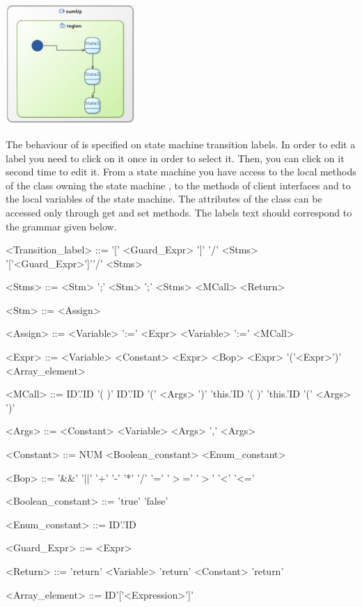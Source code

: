 \documentclass[12pt]{article}
\begin{document}
     \centerline{
     \includegraphics[width=5cm]{draws/sm-no-lbl.png}
     \label{fig:vce-proj}
     }
     
The behaviour of is specified on state machine transition labels. In order to edit a label you need to click on it once in order to select it. Then, you can click on it second time to edit it. From a state machine you have access to the local methods of the class owning the state machine , to the methods of client interfaces and to the local variables of the state machine. The attributes of the class can be accessed only through get and set methods. The labels text should correspond to the grammar given below.

\begin{grammar}

<Transition_label> ::= '[' <Guard_Expr> ']' \alt '/' <Stms> \alt  '['<Guard_Expr>']'\alt '/' <Stms>

<Stms> ::= <Stm> ';' \alt <Stm> ';' <Stms> \alt <MCall> \alt <Return>

<Stm> ::= <Assign> 

<Assign> ::= <Variable> ':='  <Expr> \alt <Variable> ':=' <MCall>

<Expr> ::=  <Variable> \alt 
			<Constant> \alt  
			<Expr> <Bop> <Expr> \alt 
			'('<Expr>')' \alt
			<Array\_element>

<MCall> ::= ID'.'ID '( )' \alt 
	 ID'.'ID '(' <Args> ')' \alt 
	 'this.'ID '( )' \alt 
	'this.'ID  '(' <Args> ')'
	 
<Args> ::=  <Constant> \alt <Variable> \alt <Args> ',' <Args>

<Constant> ::= NUM \alt <Boolean_constant> \alt <Enum_constant>

<Bop> ::=  '\&\&' \alt  '||'  \alt '+' \alt '-' \alt '*' \alt '/' \alt '=' \alt '$>$=' \alt '$>$' \alt '\textless'  \alt '\textless='

<Boolean_constant> ::= 'true' \alt 'false'

<Enum_constant> ::= ID'.'ID

<Guard_Expr> ::= <Expr>

<Return> ::= 'return' <Variable> \alt 'return' <Constant> \alt  'return'

<Array\_element> ::= ID'['<Expression>']'
\end{grammar}
\end{document}

